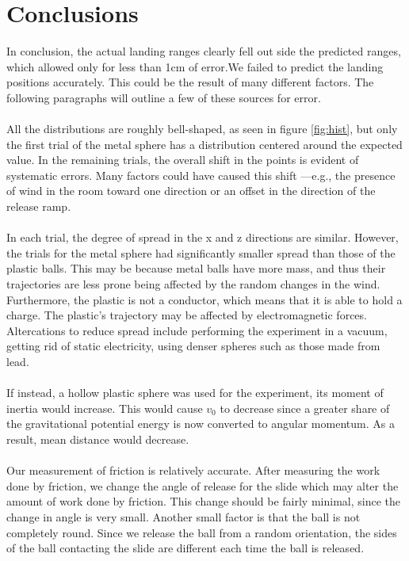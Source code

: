 \documentclass{article}
\begin{document}
\clearpage
\section{Conclusions}
In conclusion, the actual landing ranges clearly fell out side the predicted ranges, which allowed only for less than 1\si{cm} of error.We failed to predict the landing positions accurately. This could be the result of many different factors. The following paragraphs will outline a few of these sources for error.\\\\
All the distributions are roughly bell-shaped, as seen in figure \ref{fig:hist}, but only the first trial of the metal sphere has a distribution centered around the expected value. In the remaining trials, the overall shift in the points is evident of systematic errors. Many factors could have caused this shift ---e.g., the presence of wind in the room toward one direction or an offset in the direction of the release ramp. 
\\\\
In each trial, the degree of spread in the x and z directions are similar. However, the trials for the metal sphere had significantly smaller spread than those of the plastic balls. This may be because metal balls have more mass, and thus their trajectories are less prone being affected by the random changes in the wind. Furthermore, the plastic is not a conductor, which means that it is able to hold a charge. The plastic's trajectory may be affected by electromagnetic forces. Altercations to reduce spread include performing the experiment in a vacuum, getting rid of static electricity, using denser spheres such as those made from lead. 
\\\\
If instead, a hollow plastic sphere was used for the experiment, its moment of inertia would increase. This would cause $v_{0}$ to decrease since a greater share of the gravitational potential energy is now converted to angular momentum. As a result, mean distance would decrease. 
\\\\
Our measurement of friction is relatively accurate. After measuring the work done by friction, we change the angle of release for the slide which may alter the amount of work done by friction. This change should be fairly minimal, since the change in angle is very small. Another small factor is that the ball is not completely round. Since we release the ball from a random orientation, the sides of the ball contacting the slide are different each time the ball is released.
\end{document}
